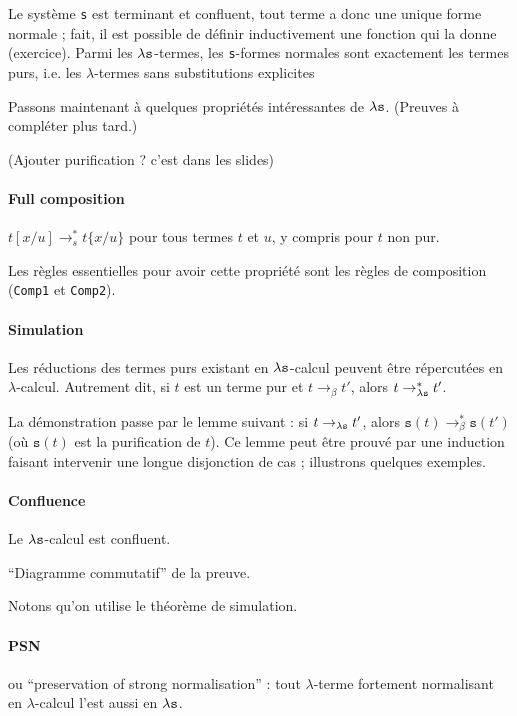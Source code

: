\documentclass[a4paper, 11pt]{article}
\begin{document}
Le système \texttt{s} est terminant et confluent, tout terme a donc une unique forme normale ; fait, il est possible de définir inductivement une fonction qui la donne (exercice). Parmi les ${\lambda \mathtt{s}}$-termes, les \texttt{s}-formes normales sont exactement les termes purs, i.e. les $\lambda$-termes sans substitutions explicites

Passons maintenant à quelques propriétés intéressantes de ${\lambda \mathtt{s}}$. (Preuves à compléter plus tard.)

(Ajouter purification ? c'est dans les slides)

\paragraph{Full composition} $t[x/u] \rightarrow_s^* t\{x/u\}$ pour tous termes $t$ et $u$, y compris pour $t$ non pur.

Les règles essentielles pour avoir cette propriété sont les règles de composition (\texttt{Comp1} et \texttt{Comp2}).

\paragraph{Simulation} Les réductions des termes purs existant en ${\lambda \mathtt{s}}$-calcul peuvent être répercutées en $\lambda$-calcul. Autrement dit, si $t$ est un terme pur et $t \rightarrow_\beta t'$, alors $t \rightarrow_{\lambda \mathtt{s}}^* t'$.

La démonstration passe par le lemme suivant : si $t \rightarrow_{\lambda \mathtt{s}} t'$, alors $\mathtt{s}(t) \rightarrow_\beta^* \mathtt{s}(t')$ (où $\mathtt{s}(t)$ est la purification de $t$). Ce lemme peut être prouvé par une induction faisant intervenir une longue disjonction de cas ; illustrons quelques exemples.

\paragraph{Confluence} Le ${\lambda \mathtt{s}}$-calcul est confluent.

\enquote{Diagramme commutatif} de la preuve.

Notons qu'on utilise le théorème de simulation.

\paragraph{PSN} ou \enquote{preservation of strong normalisation} : tout $\lambda$-terme fortement normalisant en $\lambda$-calcul l'est aussi en ${\lambda \mathtt{s}}$.
\end{document}

